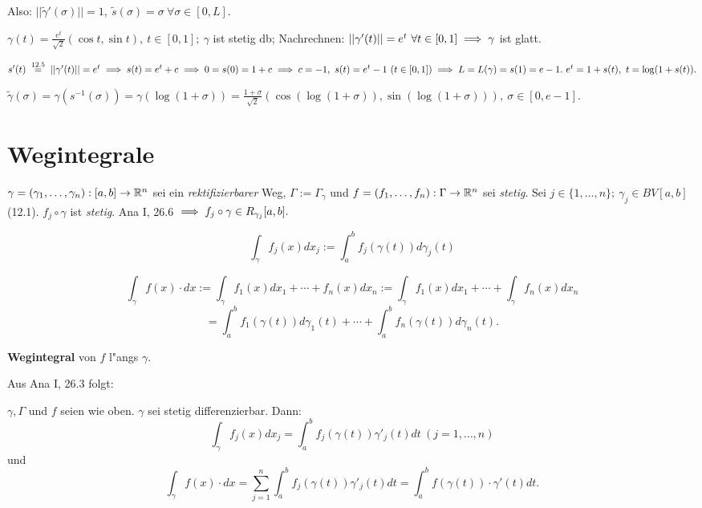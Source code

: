 \documentclass[a4paper,twoside,DIV15,BCOR12mm,chapterprefix=true,headings=twolinechapter]{scrbook}
\begin{document}
Also: $||\tilde{\gamma}'(\sigma)|| = 1,\ \tilde{s}(\sigma)=\sigma\ \forall \sigma\in[0,L].$

\begin{beispiel}
$\gamma(t) = \frac{e^t}{\sqrt{2}}(\cos t,\sin t),\ t \in [0,1];\ \gamma$ ist stetig db; Nachrechnen: $||\gamma'(t)||=e^t\ \forall t \in [0,1] \implies \gamma$ ist glatt.

$s'(t) \gleichnach{12.5} ||\gamma'(t)|| = e^t \folgt s(t) = e^t+c \folgt 0=s(0) = 1+c \folgt c=-1,\ s(t) = e^t-1\ (t\in[0,1]) \folgt L=L(\gamma)=s(1)=e-1.\ e^t=1+s(t),\ t=\log (1+s(t)).$

$\tilde{\gamma}(\sigma) = \gamma(s^{-1}(\sigma)) = \gamma(\log (1+\sigma)) = \frac{1+\sigma}{\sqrt{2}}(\cos (\log(1+\sigma)),\sin (\log(1+\sigma))),\ \sigma\in[0,e-1].$
\end{beispiel}

\chapter{Wegintegrale}
 
\begin{definition}

$\gamma=(\gamma_1,\ldots,\gamma_n):[a,b] \to \mathbb{R}^n$ sei ein \emph{rektifizierbarer} Weg, $\Gamma:=\Gamma_\gamma$ und $f=(f_1,\ldots,f_n):\Gamma \to \mathbb{R}^n$ sei \emph{stetig}. Sei $j\in\{1,\ldots,n\};\ \gamma_j\in BV[a,b]$ (12.1). $f_j\circ \gamma$ ist \emph{stetig}. Ana I, 26.6 $\implies f_j\circ\gamma \in R_{\gamma_j}[a,b].$

$$\int_\gamma f_j(x)dx_j := \int_a^b f_j(\gamma(t))d\gamma_j(t)$$

$$\int_\gamma f(x)\cdot dx := \int_\gamma f_1(x)dx_1+\cdots+f_n(x)dx_n := \int_\gamma f_1(x)dx_1+\cdots+\int_\gamma f_n(x)dx_n$$
$$= \int_a^b f_1(\gamma(t)) d\gamma_1(t)+\cdots +\int_a^b f_n(\gamma(t)) d\gamma_n(t).$$

\textbf{Wegintegral} von $f$ l"angs $\gamma$.
\end{definition}

Aus Ana I, 26.3 folgt:

\begin{satz}
$\gamma,\Gamma$ und $f$ seien wie oben. $\gamma$ sei stetig differenzierbar. Dann:
$$\int_\gamma f_j(x)dx_j = \int_a^b f_j(\gamma(t))\gamma'_j(t)dt\ (j=1,\ldots,n)$$ und $$\int_\gamma f(x)\cdot dx = \sum_{j=1}^{n} \int_a^b f_j(\gamma(t))\gamma'_j(t) dt = \int_a^b f(\gamma(t))\cdot\gamma'(t) dt.$$
\end{satz}
\end{document}
